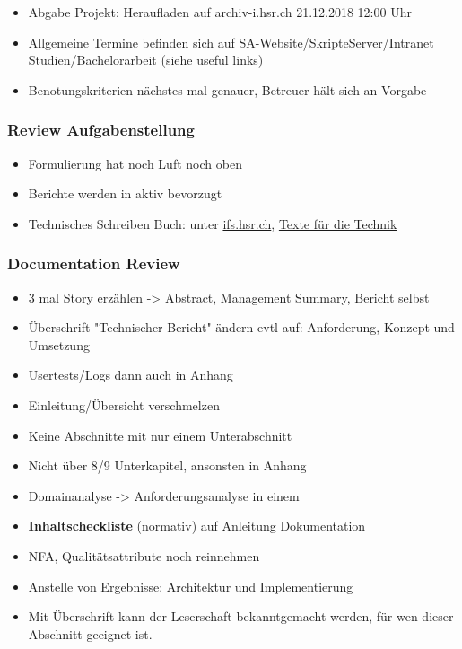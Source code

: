 \begin{itemize}

\item
  Abgabe Projekt: Heraufladen auf archiv-i.hsr.ch 21.12.2018 12:00 Uhr
\item
  Allgemeine Termine befinden sich auf SA-Website/SkripteServer/Intranet
  Studien/Bachelorarbeit (siehe useful links)
\item
  Benotungskriterien nächstes mal genauer, Betreuer hält sich an Vorgabe
\end{itemize}

\hypertarget{review-aufgabenstellung}{%
\subsubsection*{Review Aufgabenstellung}\label{review-aufgabenstellung}}

\begin{itemize}

\item
  Formulierung hat noch Luft noch oben
\item
  Berichte werden in aktiv bevorzugt
\item
  Technisches Schreiben Buch: unter
  \href{https://www.ifs.hsr.ch/index.php?id=13194\&L=4campusmap\%2F}{ifs.hsr.ch},
  \href{https://link.springer.com/book/10.1007\%2F978-3-642-13827-0}{Texte
  für die Technik}
\end{itemize}

\hypertarget{documentation-review}{%
\subsubsection*{Documentation Review}\label{documentation-review}}

\begin{itemize}

\item
  3 mal Story erzählen -\textgreater{} Abstract, Management Summary,
  Bericht selbst
\item
  Überschrift "Technischer Bericht" ändern evtl auf: Anforderung,
  Konzept und Umsetzung
\item
  Usertests/Logs dann auch in Anhang
\item
  Einleitung/Übersicht verschmelzen
\item
  Keine Abschnitte mit nur einem Unterabschnitt
\item
  Nicht über 8/9 Unterkapitel, ansonsten in Anhang
\item
  Domainanalyse -\textgreater{} Anforderungsanalyse in einem
\item
  \textbf{Inhaltscheckliste} (normativ) auf Anleitung Dokumentation
\item
  NFA, Qualitätsattribute noch reinnehmen
\item
  Anstelle von Ergebnisse: Architektur und Implementierung
\item
  Mit Überschrift kann der Leserschaft bekanntgemacht werden, für wen
  dieser Abschnitt geeignet ist.
\end{itemize}

